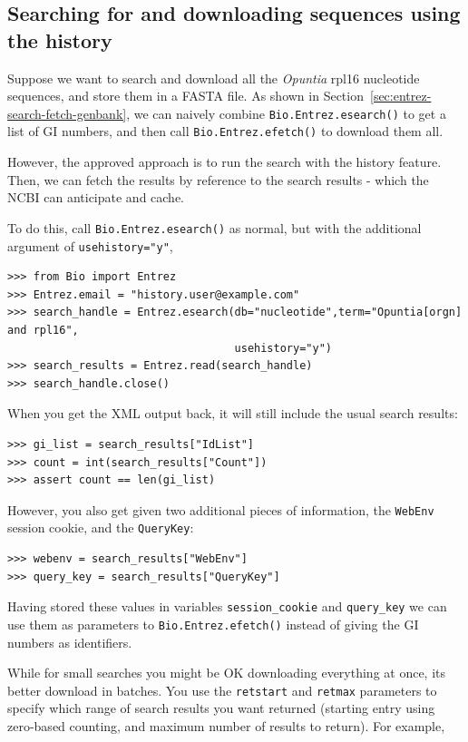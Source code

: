 \documentclass{report}
\begin{document}
\subsection{Searching for and downloading sequences using the history}
Suppose we want to search and download all the \textit{Opuntia} rpl16
nucleotide sequences, and store them in a FASTA file.  As shown in
Section~\ref{sec:entrez-search-fetch-genbank}, we can naively combine
\verb|Bio.Entrez.esearch()| to get a list of GI numbers, and then call
\verb|Bio.Entrez.efetch()| to download them all.

However, the approved approach is to run the search with the history
feature.  Then, we can fetch the results by reference to the search
results - which the NCBI can anticipate and cache.

To do this, call \verb|Bio.Entrez.esearch()| as normal, but with the
additional argument of \verb|usehistory="y"|,

\begin{verbatim}
>>> from Bio import Entrez
>>> Entrez.email = "history.user@example.com"
>>> search_handle = Entrez.esearch(db="nucleotide",term="Opuntia[orgn] and rpl16",
                                   usehistory="y")
>>> search_results = Entrez.read(search_handle)
>>> search_handle.close()
\end{verbatim}

\noindent When you get the XML output back, it will still include the usual search results:

\begin{verbatim}
>>> gi_list = search_results["IdList"]
>>> count = int(search_results["Count"])
>>> assert count == len(gi_list)
\end{verbatim}

\noindent However, you also get given two additional pieces of information, the {\tt WebEnv} session cookie, and the {\tt QueryKey}:

\begin{verbatim}
>>> webenv = search_results["WebEnv"]
>>> query_key = search_results["QueryKey"] 
\end{verbatim}

Having stored these values in variables {\tt session\_cookie} and {\tt query\_key} we can use them as parameters to \verb|Bio.Entrez.efetch()| instead of giving the GI numbers as identifiers.  

While for small searches you might be OK downloading everything at once, its better download in batches.  You use the {\tt retstart} and {\tt retmax} parameters to specify which range of search results you want returned (starting entry using zero-based counting, and maximum number of results to return).  For example,
\end{document}
